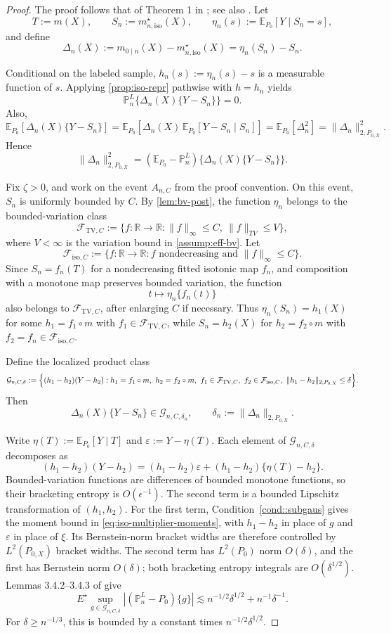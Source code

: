 \documentclass{article}
\theoremstyle{plain}
\theoremstyle{definition}
\newcommand{\E}{\mathbb{E}}
\newcommand{\R}{\mathbb{R}}
\newcommand{\1}{\mathbbm{1}}
\newcommand{\mhat}{m}
\newcommand{\Pl}{\mathbb{P}^{L}_n}
\newcommand{\Px}{P_{0,X}}
\begin{document}
\begin{proof}
The proof follows that of Theorem 1 in \cite{van2023causal}; see also \cite{van2025venn}. Let
\[
T:=\mhat(X),\qquad S_n:=m_{n,\mathrm{iso}}^\star(X),\qquad \eta_n(s):=\E_{P_0}[Y\mid S_n=s],
\]
and define
\[
\Delta_n(X):=m_{0\mid n}(X)-m_{n,\mathrm{iso}}^\star(X)=\eta_n(S_n)-S_n.
\]

Conditional on the labeled sample, \(h_n(s):=\eta_n(s)-s\) is a measurable function of \(s\). Applying \cref{prop:iso-repr} pathwise with \(h=h_n\) yields
\[
\Pl\{\Delta_n(X)\{Y-S_n\}\}=0.
\]
Also,
\[
\E_{P_0}[\Delta_n(X)\{Y-S_n\}]
=
\E_{P_0}[\Delta_n(X)\,\E_{P_0}[Y-S_n\mid S_n]]
=
\E_{P_0}[\Delta_n^2]
=
\|\Delta_n\|_{2,\Px}^2.
\]
Hence
\[
\|\Delta_n\|_{2,\Px}^2
=
(\E_{P_0}-\Pl)\{\Delta_n(X)\{Y-S_n\}\}.
\]

Fix \(\zeta>0\), and work on the event \(A_{n,C}\) from the proof convention. On this event, \(S_n\) is uniformly bounded by \(C\). By \cref{lem:bv-post}, the function \(\eta_n\) belongs to the bounded-variation class
\[
\mathcal F_{\mathrm{TV},C}
:=
\{f:\R\to\R:\|f\|_\infty\le C,\ \|f\|_{TV}\le V\},
\]
where \(V<\infty\) is the variation bound in \cref{assump:eff-bv}. Let
\[
\mathcal F_{\mathrm{iso},C}
:=
\{f:\R\to\R:\text{$f$ nondecreasing and }\|f\|_\infty\le C\}.
\]
Since \(S_n=f_n(T)\) for a nondecreasing fitted isotonic map \(f_n\), and composition with a monotone map preserves bounded variation, the function
\[
t\mapsto \eta_n\{f_n(t)\}
\]
also belongs to \(\mathcal F_{\mathrm{TV},C}\), after enlarging \(C\) if necessary. Thus \(\eta_n(S_n)=h_1(X)\) for some \(h_1=f_1\circ\mhat\) with \(f_1\in\mathcal F_{\mathrm{TV},C}\), while \(S_n=h_2(X)\) for \(h_2=f_2\circ\mhat\) with \(f_2=f_n\in\mathcal F_{\mathrm{iso},C}\).

Define the localized product class
\[
\mathcal G_{n,C,\delta}
:=
\Bigl\{
(h_1-h_2)(Y-h_2):
h_1=f_1\circ\mhat,\ h_2=f_2\circ\mhat,\
f_1\in\mathcal F_{\mathrm{TV},C},\
f_2\in\mathcal F_{\mathrm{iso},C},\
\|h_1-h_2\|_{2,\Px}\le \delta
\Bigr\}.
\]
Then
\[
\Delta_n(X)\{Y-S_n\}\in\mathcal G_{n,C,\delta_n},
\qquad
\delta_n:=\|\Delta_n\|_{2,\Px}.
\]

Write \(\eta(T):=\E_{P_0}[Y\mid T]\) and \(\varepsilon:=Y-\eta(T)\). Each element of \(\mathcal G_{n,C,\delta}\) decomposes as
\[
(h_1-h_2)(Y-h_2)
=
(h_1-h_2)\varepsilon+(h_1-h_2)\{\eta(T)-h_2\}.
\]
Bounded-variation functions are differences of bounded monotone functions, so their bracketing entropy is \(O(\epsilon^{-1})\). The second term is a bounded Lipschitz transformation of \((h_1,h_2)\). For the first term, Condition~\ref{cond::subgaus} gives the moment bound in \eqref{eq:iso-multiplier-moments}, with \(h_1-h_2\) in place of \(g\) and \(\varepsilon\) in place of \(\xi\). Its Bernstein-norm bracket widths are therefore controlled by \(L^2(\Px)\) bracket widths. The second term has \(L^2(P_0)\) norm \(O(\delta)\), and the first has Bernstein norm \(O(\delta)\); both bracketing entropy integrals are \(O(\delta^{1/2})\). Lemmas 3.4.2--3.4.3 of \citet{vdvwellner1996} give
\[
E^\star\sup_{g\in\mathcal G_{n,C,\delta}}|(\Pl-P_0)\{g\}|
\lesssim
n^{-1/2}\delta^{1/2}+n^{-1}\delta^{-1}.
\]
For \(\delta\ge n^{-1/3}\), this is bounded by a constant times \(n^{-1/2}\delta^{1/2}\).


\end{proof}
\end{document}
